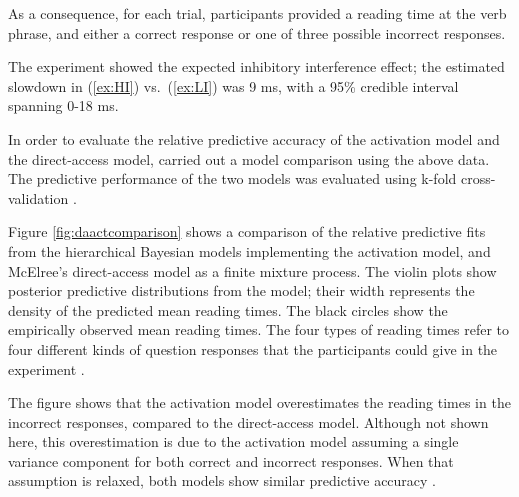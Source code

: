 \documentclass{cambridge7A}\usepackage[]{graphicx}\usepackage[]{color}
\begin{document}
As a consequence, for each trial, participants provided a reading time at the verb phrase, and either a correct response or one of three possible incorrect responses. 

The experiment showed the expected inhibitory interference effect; the estimated slowdown in (\ref{ex:HI}) vs.\ (\ref{ex:LI}) was 9 ms, with a 95\% credible interval spanning 0-18 ms.  

In order to evaluate the relative predictive accuracy of the activation model and the  direct-access model, \cite{NicenboimRetrieval2018} carried out a model comparison using the above data. The predictive performance of the two models was evaluated using  k-fold cross-validation \citep{vehtari2012survey,vehtari2016LOOwaic}.  

Figure \ref{fig:daactcomparison} shows a comparison of the relative predictive fits from the hierarchical Bayesian models implementing the activation model, and McElree's direct-access model as a finite mixture process. The violin plots show posterior predictive distributions from the model; their width represents the density of the predicted mean reading times. The black circles show the empirically observed mean reading times. The four types of reading times refer to four different kinds of question responses that the participants could give in the experiment \citep{nicenboimexploratory}. 

The figure shows that the activation model overestimates the reading times in the incorrect responses, compared to the direct-access model. Although not shown here, this overestimation is due to the activation model assuming a single variance component for both correct and incorrect responses. When that assumption is relaxed, both models show similar predictive accuracy \citep{NicenboimRetrieval2018}.
\end{document}
